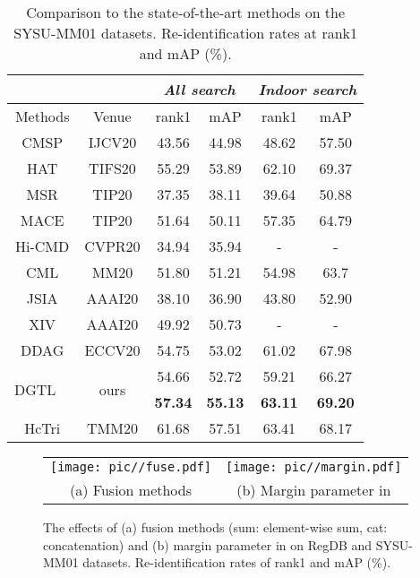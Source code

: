 \documentclass[journal]{IEEEtran}
\begin{document}
\begin{table}
\caption{Comparison to the state-of-the-art methods on the SYSU-MM01 datasets. Re-identification rates at rank1 and mAP (\%).}
\label{tab:sota_sysu}
  \centering
  \begin{tabular}{lc|c|c|c||c|c}
    \toprule[2pt]
    \multicolumn{3}{c|}{}  & \multicolumn{2}{c||}{\emph{All search}} & \multicolumn{2}{c}{\emph{Indoor search}} \\ \hline
      \multicolumn{2}{c|}{Methods} & Venue &   rank1   & mAP   &  rank1  & mAP      \\ \toprule[1pt]
      \multicolumn{2}{c|}{CMSP \cite{wu2020rgb}} & IJCV20 & 43.56   & 44.98  & 48.62   & 57.50  \\
      \multicolumn{2}{c|}{HAT \cite{ye2020vipr}} & TIFS20 & 55.29  & 53.89 & 62.10  & 69.37  \\
      \multicolumn{2}{c|}{MSR \cite{Feng2020LearningMR}} & TIP20 & 37.35  & 38.11  & 39.64  & 50.88  \\
      \multicolumn{2}{c|}{MACE \cite{Ye2020CrossModalityPR}} & TIP20 & 51.64 & 50.11 & 57.35 & 64.79 \\
      \multicolumn{2}{c|}{Hi-CMD \cite{choi2020hi}} & CVPR20 & 34.94  & 35.94   &  - & -   \\
      \multicolumn{2}{c|}{CML \cite{Ling2020ClassAwareMM}} & MM20 & 51.80 & 51.21 & 54.98 & 63.7 \\
      \multicolumn{2}{c|}{JSIA \cite{Wang2020CrossModalityPG}} & AAAI20 & 38.10  & 36.90 & 43.80  & 52.90 \\
      \multicolumn{2}{c|}{XIV \cite{Li2020InfraredVisibleCP}} & AAAI20 & 49.92  & 50.73  &  - & -   \\
\multicolumn{2}{c|}{DDAG \cite{ye2020dynamic}} & ECCV20 & 54.75  & 53.02 & 61.02  & 67.98 \\  \hline
      \multirow{2}{*}{DGTL} &  & \multirow{2}{*}{ours} & 54.66 & 52.72 & 59.21 & 66.27 \\
                                & & & \textbf{57.34} & \textbf{55.13} & \textbf{63.11} & \textbf{69.20} \\ \hline  \hline
      \multicolumn{2}{c|}{HcTri \cite{Liu2020ParametersSE}} & TMM20 & 61.68 & 57.51 & 63.41 & 68.17 \\
      \toprule[2pt]
  \end{tabular}
\end{table}

\begin{figure*}
\centering
\begin{tabular}{c@{\hspace{2mm}}c}
\texttt{[image: pic//fuse.pdf]} &
\texttt{[image: pic//margin.pdf]} \\ (a) Fusion methods  & (b) Margin parameter  in 
\end{tabular}
\caption{The effects of (a) fusion methods (sum: element-wise sum, cat: concatenation) and (b) margin parameter  in  on RegDB and SYSU-MM01 datasets. Re-identification rates of rank1 and mAP (\%).}
\label{fig:fuse_margin}
\end{figure*}
\end{document}
